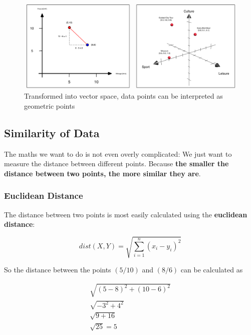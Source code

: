 \documentclass[11pt]{article}
\begin{document}
\begin{figure}[htb!]
    \centering
    \includegraphics[keepaspectratio=true, width=\linewidth]{geometric_interpretation.png}
    \caption{Transformed into vector space, data points can be interpreted as geometric points}
    \label{fig:geometric_intepretation}
\end{figure}

\newpage

\subsection{Similarity of Data}

The maths we want to do is not even overly complicated: We just want to measure the distance between different points. Because \textbf{the smaller the distance between two points, the more similar they are}.

\subsubsection{Euclidean Distance}

The distance between two points is most easily calculated using the \textbf{euclidean distance}:

\begin{equation}
    dist(X,Y)= \sqrt{\sum^{n}_{i=1}(x_{i}-y_{i})^2}
\end{equation}

So the distance between the points $(5/10)$ and $(8/6)$ can be calculated as

\begin{align}
    \sqrt{(5-8)^2 + (10-6)^2} \\
    \sqrt{-3^2 + 4^2}         \\
    \sqrt{9+16}               \\
    \sqrt{25} = 5
\end{align}

\newpage
\end{document}
